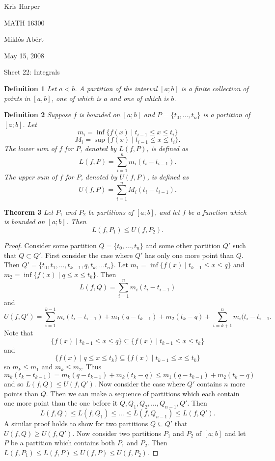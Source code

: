 \documentclass{article}
\begin{document}
\begin{flushright}
Kris Harper

MATH 16300

Mikl\'{o}s Ab\'{e}rt

May 15, 2008
\end{flushright}

\begin{flushleft}

\Large

Sheet 22: Integrals\newline

\normalsize

\textbf{Definition 1}
\textsl{Let $a<b$. A partition of the interval $[a;b]$ is a finite collection of points in $[a,b]$, one of which is $a$ and one of which is $b$.}\newline

\textbf{Definition 2}
\textsl{Suppose $f$ is bounded on $[a;b]$ and $P=\{t_0, \dots , t_n\}$ is a partition of $[a;b]$. Let
\[
m_i = \inf \{f(x) \mid t_{i-1} \leq x \leq t_i\}
\]
\[
M_i = \sup \{f(x) \mid t_{i-1} \leq x \leq t_i\}.
\]
The lower sum of $f$ for $P$, denoted by $L(f,P)$, is defined as
\[
L(f,P) = \sum_{i=1}^n m_i (t_i - t_{i-1}).
\]
The upper sum of $f$ for $P$, denoted by $U(f,P)$, is defined as
\[
U(f,P) = \sum_{i=1}^n M_i (t_i - t_{i-1}).
\]}\newline

\textbf{Theorem 3}
\textsl{Let $P_1$ and $P_2$ be partitions of $[a;b]$, and let $f$ be a function which is bounded on $[a;b]$. Then
\[
L(f,P_1) \leq U(f,P_2).
\]}
\begin{proof}
Consider some partition $Q = \{t_0, \dots , t_n\}$ and some other partition $Q'$ such that $Q \subset Q'$. First consider the case where $Q'$ has only one more point than $Q$. Then $Q' = \{t_0, t_1, \dots , t_{k-1}, q, t_k, \dots t_n\}$. Let $m_1 = \inf \{f(x) \mid t_{k-1} \leq x \leq q\}$ and $m_2 = \inf \{f(x) \mid q \leq x \leq t_k\}$. Then
\[
L(f,Q) = \sum_{i=1}^n m_i (t_i - t_{i-1})
\]
and
\[
U(f,Q') = \sum_{i=1}^{k-1} m_i (t_i-t_{i-1}) + m_1 (q-t_{k-1}) + m_2 (t_k-q) + \sum_{i=k+1}^n m_i (t_i-t_{i-1}.
\]
Note that
\[
\{f(x) \mid t_{k-1} \leq x \leq q\} \subseteq \{f(x) \mid t_{k-1} \leq x \leq t_k\}
\]
and
\[
\{f(x) \mid q \leq x \leq t_k\} \subseteq \{f(x) \mid t_{k-1} \leq x \leq t_k\}
\]
so $m_k \leq m_1$ and $m_k \leq m_2$. Thus
\[
m_k (t_k - t_{k-1}) = m_k (q - t_{k-1}) + m_k (t_k - q) \leq m_1 (q - t_{k-1}) + m_2 (t_k - q)
\]
and so $L(f,Q) \leq U(f,Q')$. Now consider the case where $Q'$ contains $n$ more points than $Q$. Then we can make a sequence of partitions which each contain one more point than the one before it $Q, Q_1, Q_2, \dots , Q_{n-1}, Q'$. Then
\[
L(f,Q) \leq L(f,Q_1) \leq \dots \leq L(f,Q_{n-1}) \leq L(f,Q').
\]
A similar proof holds to show for two partitions $Q \subseteq Q'$ that $U(f,Q) \geq U(f,Q')$. Now consider two partitions $P_1$ and $P_2$ of $[a;b]$ and let $P$ be a partition which contains both $P_1$ and $P_2$. Then $L(f,P_1) \leq L(f,P) \leq U(f,P) \leq U(f,P_2)$.
\end{proof}


\end{flushleft}
\end{document}

